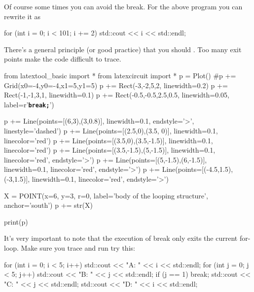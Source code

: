 Of course some times you can avoid the break. For the above program you
can rewrite it as
\begin{console}
for (int i = 0; i < 101; i += 2)
{   
    std::cout << i << std::endl;
}
\end{console}
There's a general principle (or good practice) that you
should . Too
many exit points make the code difficult to trace.
\begin{python}
from latextool_basic import *
from latexcircuit import *
p = Plot()
#p += Grid(x0=-4,y0=-4,x1=5,y1=5)
p += Rect(-3,-2,5,2, linewidth=0.2)
p += Rect(-1,-1,3,1, linewidth=0.1)
p += Rect(-0.5,-0.5,2.5,0.5, linewidth=0.05, label=r'\texttt{\textbf{break;}}')


p += Line(points=[(6,3),(3,0.8)], linewidth=0.1, endstyle='>', linestyle='dashed')
p += Line(points=[(2.5,0),(3.5, 0)], linewidth=0.1, linecolor='red')
p += Line(points=[(3.5,0),(3.5,-1.5)], linewidth=0.1, linecolor='red')
p += Line(points=[(3.5,-1.5),(5,-1.5)], linewidth=0.1, linecolor='red', endstyle='>')
p += Line(points=[(5,-1.5),(6,-1.5)], linewidth=0.1, linecolor='red', endstyle='>')
p += Line(points=[(-4.5,1.5),(-3,1.5)], linewidth=0.1, linecolor='red', endstyle='>')

X = POINT(x=6, y=3, r=0, label='body of the looping structure', anchor='south')
p += str(X)

print(p)
\end{python}
It's very important to note that the execution of break
only exits the current for-loop. Make sure you trace and run try this:
\begin{console}
for (int i = 0; i < 5; i++)
{   
    std::cout << "A: " << i << std::endl;
    for (int j = 0; j < 5; j++)
    {   
        std::cout << "B: " << j << std::endl;
        if (j == 1) break;
        std::cout << "C: " << j << std::endl;
    }
    std::cout << "D: " << i << std::endl;
}
\end{console}
